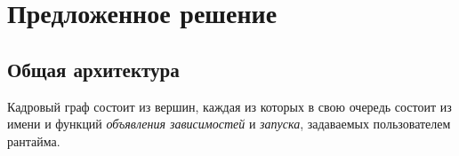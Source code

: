 \section{Предложенное решение}
\subsection{Общая архитектура}
Кадровый граф состоит из вершин, каждая из которых в свою очередь состоит из имени и функций \textit{объявления зависимостей} и \textit{запуска}, задаваемых пользователем рантайма.
